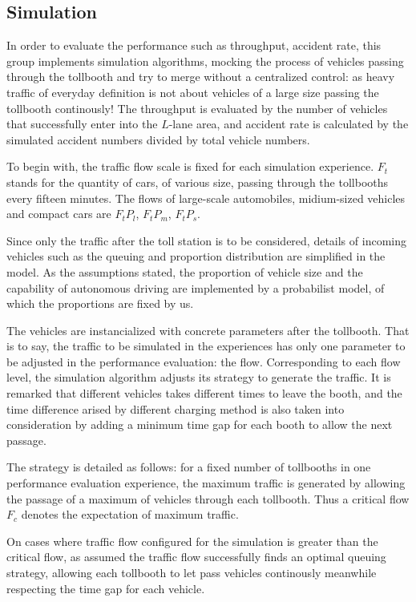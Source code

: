 \documentclass{mcmthesis}
\begin{document}
\subsection{Simulation}
In order to evaluate the performance such as throughput, accident rate, this group implements simulation algorithms, mocking the process of vehicles passing through the tollbooth and try to merge without a centralized control: as heavy traffic of everyday definition is not about vehicles of a large size passing the tollbooth continously! The throughput is evaluated by the number of vehicles that successfully enter into the $L$-lane area, and accident rate is calculated by the simulated accident numbers divided by total vehicle numbers.

To begin with, the traffic flow scale is fixed for each simulation experience. $F_t$ stands for the quantity of cars, of various size, passing through the tollbooths every fifteen minutes. The flows of large-scale automobiles, midium-sized vehicles and compact cars are $F_tP_l$, $F_tP_m$, $F_tP_s$.

Since only the traffic after the toll station is to be considered, details of incoming vehicles such as the queuing and proportion distribution are simplified in the model. As the assumptions stated, the proportion of vehicle size and the capability of autonomous driving are implemented by a probabilist model, of which the proportions are fixed by us. 

The vehicles are instancialized with concrete parameters after the tollbooth. That is to say, the traffic to be simulated in the experiences has only one parameter to be adjusted in the performance evaluation: the flow. Corresponding to each flow level, the simulation algorithm adjusts its strategy to generate the traffic. It is remarked that different vehicles takes different times to leave the booth, and the time difference arised by different charging method is also taken into consideration by adding a minimum time gap for each booth to allow the next passage.

The strategy is detailed as follows: for a fixed number of tollbooths in one performance evaluation experience, the maximum traffic is generated by allowing the passage of a maximum of vehicles through each tollbooth. Thus a critical flow $F_c$ denotes the expectation of maximum traffic. 

On cases where traffic flow configured for the simulation is greater than the critical flow, as assumed the traffic flow successfully finds an optimal queuing strategy, allowing each tollbooth to let pass vehicles continously meanwhile respecting the time gap for each vehicle. 
\end{document}
